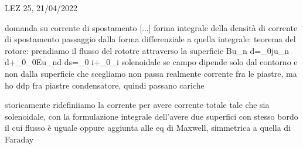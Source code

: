 %	
%	 
%	 
%
%
%		
%	
%	
%	
%
%


LEZ 25, 21/04/2022

domanda su corrente di spostamento
[...]
forma integrale della densità di corrente di spostamento
passaggio dalla forma differenziale a quella integrale: teorema del rotore: prendiamo il flusso del rototre attraverso la superficie 
	\Sigma	\int\curl\vba B\vdot\vbh u_n d\Sigma =\mu_0\int\vba j\vdot\vbh u_n d\Sigma +\mu_0\epsilon_0\int\vba E\vdot \vbh u_nd\Sigma
	\int\vba\vdot d\vba s=\mu_0 i+\mu_0_{i}
solenoidale se campo dipende solo dal contorno e non dalla superficie che scegliamo non passa realmente corrente fra le piastre, ma ho ddp fra piastre condensatore, quindi passano cariche

storicamente ridefiniiamo la corrente per avere corrente totale tale che sia solenoidale, con la formulazione integrale dell'avere due superfici con stesso bordo il cui flusso è uguale
oppure aggiunta alle eq di Maxwell, simmetrica a quella di Faraday

